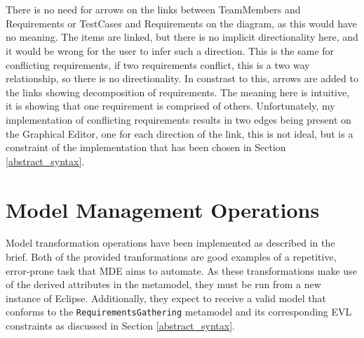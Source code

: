 \documentclass{article}
\begin{document}
\\\\
There is no need for arrows on the links between TeamMembers and Requirements or TestCases and Requirements on the diagram, as this would have no meaning. The items are linked, but there is no implicit directionality here, and it would be wrong for the user to infer such a direction. This is the same for conflicting requirements, if two requirements conflict, this is a two way relationship, so there is no directionality. In constrast to this, arrows are added to the links showing decomposition of requirements. The meaning here is intuitive, it is showing that one requirement is comprised of others. Unfortunately, my implementation of conflicting requirements results in two edges being present on the Graphical Editor, one for each direction of the link, this is not ideal, but is a constraint of the implementation that has been chosen in Section \ref{abstract_syntax}.


\section{Model Management Operations}
Model transformation operations have been implemented as described in the brief. Both of the provided tranformations are good examples of a repetitive, error-prone task that MDE aims to automate. As these transformations make use of the derived attributes in the metamodel, they must be run from a new instance of Eclipse. Additionally, they expect to receive a valid model that conforms to the \texttt{RequirementsGathering} metamodel and its corresponding EVL constraints as discussed in Section \ref{abstract_syntax}.
\end{document}

